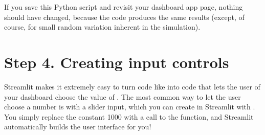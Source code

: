 \documentclass[letterpaper,10pt,english]{sphinxmanual}
\begin{document}
\begin{sphinxVerbatim}[commandchars=\\\{\}]
   
   

      
                    

  
       

   
  \PYG{p}{[}      \PYG{p}{]}
  

     
     
\end{sphinxVerbatim}

If you save this Python script and revisit your dashboard app page, nothing should have changed, because the code produces the same results (except, of course, for small random variation inherent in the simulation).


\section{Step 4. Creating input controls}
\label{\detokenize{chapter-14-dashboards:step-4-creating-input-controls}}
Streamlit makes it extremely easy to turn code like  into code that lets the user of your dashboard choose the value of .  The most common way to let the user choose a number is with a slider input, which you can create in Streamlit with .  You simply replace the constant 1000 with a call to the  function, and Streamlit automatically builds the user interface for you!
\end{document}
